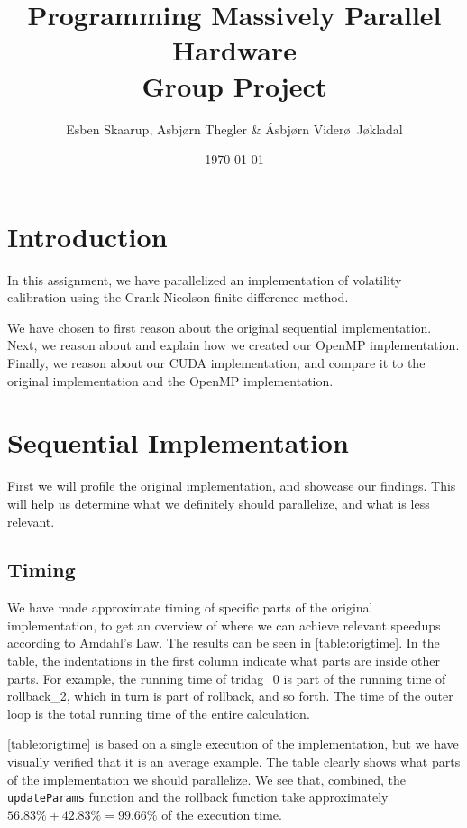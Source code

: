 \documentclass[11pt]{article}
\def\Title{Programming Massively Parallel Hardware\\
\vspace{1.5cm}
\textbf{Group Project}}
\def\Author{Esben Skaarup, Asbj\o rn Thegler \& \'{A}sbj\o rn Vider\o \ J\o kladal}
\begin{document}
\title{\Title}
\author{\Author}
\date{\today}
\maketitle

\section{Introduction}
In this assignment, we have parallelized an implementation of volatility calibration using the Crank-Nicolson finite difference method.

We have chosen to first reason about the original sequential implementation. 
Next, we reason about and explain how we created our OpenMP 
implementation. Finally, we reason about our CUDA implementation, and compare
it to the original implementation and the OpenMP implementation.

\section{Sequential Implementation}
First we will profile the original implementation, and showcase our findings.
This will help us determine what we definitely should parallelize, and what is
less relevant.

\subsection{Timing}
We have made approximate timing of specific parts of the original 
implementation, to get an overview 
of where we can achieve relevant speedups according to Amdahl's Law. The results
can be seen in \autoref{table:origtime}. In the table, the indentations 
in the first column indicate what parts are inside other parts. For example,
the running time of tridag\_0 is part of the running time of rollback\_2, which
in turn is part of rollback, and so forth. The time of the outer loop is the 
total running time of the entire calculation. 

\autoref{table:origtime} is based on a single execution of the implementation, 
but we have visually verified that it is an average example. 
The table clearly shows what parts of the implementation we should parallelize.
We see that, combined, the \texttt{updateParams} function and the rollback function take approximately $56.83\%+42.83\%=99.66\%$ of the execution time.
\end{document}
